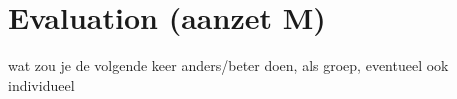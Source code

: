 
\section{Evaluation (aanzet M)}
wat zou je de volgende keer anders/beter doen, als groep, eventueel ook individueel
